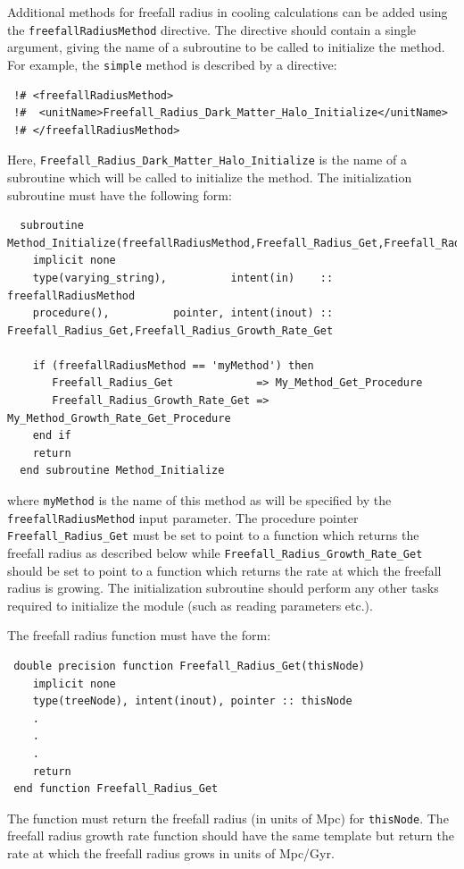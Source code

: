 Additional methods for freefall radius in cooling calculations can be added using the {\tt freefallRadiusMethod} directive. The directive should contain a single argument, giving the name of a subroutine to be called to initialize the method. For example, the {\tt simple} method is described by a directive:
\begin{verbatim}
 !# <freefallRadiusMethod>
 !#  <unitName>Freefall_Radius_Dark_Matter_Halo_Initialize</unitName>
 !# </freefallRadiusMethod>
\end{verbatim}
Here, {\tt Freefall\_Radius\_Dark\_Matter\_Halo\_Initialize} is the name of a subroutine which will be called to initialize the method. The initialization subroutine must have the following form:
\begin{verbatim}
  subroutine Method_Initialize(freefallRadiusMethod,Freefall_Radius_Get,Freefall_Radius_Growth_Rate_Get)
    implicit none
    type(varying_string),          intent(in)    :: freefallRadiusMethod
    procedure(),          pointer, intent(inout) :: Freefall_Radius_Get,Freefall_Radius_Growth_Rate_Get
    
    if (freefallRadiusMethod == 'myMethod') then
       Freefall_Radius_Get             => My_Method_Get_Procedure
       Freefall_Radius_Growth_Rate_Get => My_Method_Growth_Rate_Get_Procedure
    end if
    return
  end subroutine Method_Initialize
\end{verbatim}
where {\tt myMethod} is the name of this method as will be specified by the {\tt freefallRadiusMethod} input parameter. The procedure pointer {\tt Freefall\_Radius\_Get} must be set to point to a function which returns the freefall radius as described below while {\tt Freefall\_Radius\_Growth\_Rate\_Get} should be set to point to a function which returns the rate at which the freefall radius is growing. The initialization subroutine should perform any other tasks required to initialize the module (such as reading parameters etc.).

The freefall radius function must have the form:
\begin{verbatim}
 double precision function Freefall_Radius_Get(thisNode)
    implicit none
    type(treeNode), intent(inout), pointer :: thisNode
    .
    .
    .
    return
 end function Freefall_Radius_Get
\end{verbatim}
The function must return the freefall radius (in units of Mpc) for {\tt thisNode}. The freefall radius growth rate function should have the same template but return the rate at which the freefall radius grows in units of Mpc/Gyr.

